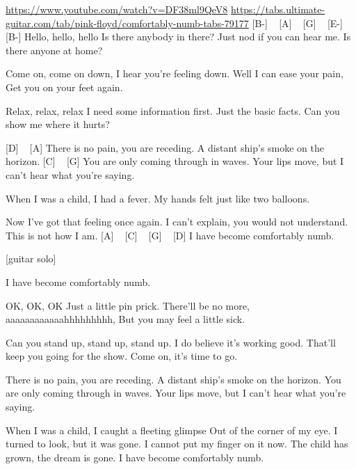 
\url{https://www.youtube.com/watch?v=DF38ml9QeV8}
\url{https://tabs.ultimate-guitar.com/tab/pink-floyd/comfortably-numb-tabs-79177}
[B-] ~ [A] ~ [G] ~ [E-] ~ [B-]
Hello, hello, hello
Is there anybody in there?
Just nod if you can hear me.
Is there anyone at home?


Come on, come on down,
I hear you're feeling down.
Well I can ease your pain,
Get you on your feet again.

Relax, relax, relax
I need some information first.
Just the basic facts.
Can you show me where it hurts?

[D] ~ [A] 
There is no pain, you are receding.
A distant ship's smoke on the horizon.
[C] ~ [G] 
You are only coming through in waves.
Your lips move, but I can't hear what you're saying.

When I was a child, I had a fever.
My hands felt just like two balloons.

Now I've got that feeling once again.
I can't explain, you would not understand.
This is not how I am.
[A] ~ [C] ~ [G] ~ [D]
I have become comfortably numb.

[guitar solo]

I have become comfortably numb.

OK, OK, OK
Just a little pin prick.
There'll be no more, aaaaaaaaaaaahhhhhhhhh,
But you may feel a little sick.

Can you stand up, stand up, stand up.
I do believe it's working good.
That'll keep you going for the show.
Come on, it's time to go.

There is no pain, you are receding.
A distant ship's smoke on the horizon.
You are only coming through in waves.
Your lips move, but I can't hear what you're saying.

When I was a child, I caught a fleeting glimpse
Out of the corner of my eye.
I turned to look, but it was gone.
I cannot put my finger on it now.
The child has grown, the dream is gone.
I have become comfortably numb. 